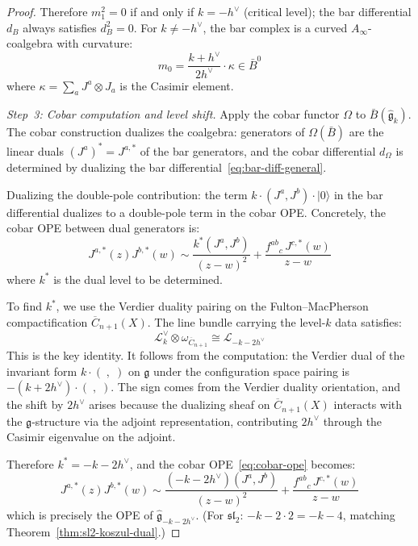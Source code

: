 \begin{proof}
Therefore $m_1^2 = 0$ if and only if $k = -h^\vee$ (critical level); the bar differential $d_B$ always satisfies $d_B^2 = 0$.  For $k \neq -h^\vee$, the bar complex is a curved $A_\infty$-coalgebra with curvature:
\begin{equation}
m_0 = \frac{k + h^\vee}{2h^\vee} \cdot \kappa \in \bar{B}^0
\end{equation}
where $\kappa = \sum_a J^a \otimes J_a$ is the Casimir element.

\emph{Step~3: Cobar computation and level shift.}
Apply the cobar functor $\Omega$ to $\bar{B}(\widehat{\mathfrak{g}}_k)$.  The cobar construction dualizes the coalgebra: generators of $\Omega(\bar{B})$ are the linear duals $(J^a)^* = J^{a,*}$ of the bar generators, and the cobar differential $d_\Omega$ is determined by dualizing the bar differential~\eqref{eq:bar-diff-general}.

Dualizing the double-pole contribution:  the term $k \cdot (J^a, J^b) \cdot |0\rangle$ in the bar differential dualizes to a double-pole term in the cobar OPE.  Concretely, the cobar OPE between dual generators is:
\begin{equation}\label{eq:cobar-ope}
J^{a,*}(z) J^{b,*}(w) \sim \frac{k^*  (J^a, J^b)}{(z-w)^2} + \frac{f^{ab}{}_{c}\, J^{c,*}(w)}{z-w}
\end{equation}
where $k^*$ is the dual level to be determined.

To find $k^*$, we use the Verdier duality pairing on the Fulton--MacPherson compactification $\overline{C}_{n+1}(X)$.  The line bundle carrying the level-$k$ data satisfies:
\begin{equation}
\mathcal{L}_k^\vee \otimes \omega_{\overline{C}_{n+1}} \cong \mathcal{L}_{-k-2h^\vee}
\end{equation}
This is the key identity.  It follows from the computation: the Verdier dual of the invariant form $k \cdot (\;,\;)$ on $\mathfrak{g}$ under the configuration space pairing is $-(k + 2h^\vee) \cdot (\;,\;)$.  The sign comes from the Verdier duality orientation, and the shift by $2h^\vee$ arises because the dualizing sheaf on $\overline{C}_{n+1}(X)$ interacts with the $\mathfrak{g}$-structure via the adjoint representation, contributing $2h^\vee$ through the Casimir eigenvalue on the adjoint.

Therefore $k^* = -k - 2h^\vee$, and the cobar OPE~\eqref{eq:cobar-ope} becomes:
\begin{equation}
J^{a,*}(z) J^{b,*}(w) \sim \frac{(-k-2h^\vee)(J^a, J^b)}{(z-w)^2} + \frac{f^{ab}{}_{c}\, J^{c,*}(w)}{z-w}
\end{equation}
which is precisely the OPE of $\widehat{\mathfrak{g}}_{-k-2h^\vee}$.  (For $\mathfrak{sl}_2$: $-k-2 \cdot 2 = -k-4$, matching Theorem~\ref{thm:sl2-koszul-dual}.)


\end{proof}
